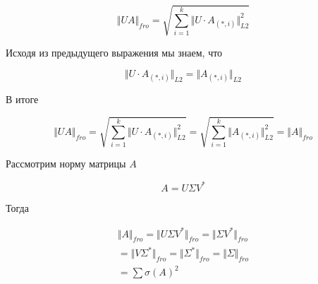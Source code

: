 \documentclass{article}
\begin{document}
    \begin{equation}
        \Vert UA \Vert_{fro} = \sqrt{ \sum_{i = 1}^{k} \Vert U \cdot A_{(*, i)} \Vert_{L2}^{2} }
    \end{equation}

    Исходя из предыдущего выражения мы знаем, что 

    \begin{equation}
        \Vert U \cdot A_{(*, i)} \Vert_{L2} =  \Vert A_{(*, i)} \Vert_{L2}
    \end{equation}

    В итоге 

    
    \begin{equation}
        \Vert UA \Vert_{fro} = \sqrt{ \sum_{i = 1}^{k} \Vert U \cdot A_{(*, i)} \Vert_{L2}^{2} } = \sqrt{ \sum_{i = 1}^{k} \Vert A_{(*, i)} \Vert_{L2}^{2} } = \Vert A \Vert_{fro}
    \end{equation}

    Рассмотрим норму матрицы $A$

    \begin{equation}
        A = U \Sigma V^{*}
    \end{equation}

    Тогда 

    \[
    \begin{gathered}
        \Vert A \Vert_{fro} = \Vert U \Sigma V^{*} \Vert_{fro} = \Vert \Sigma V^{*} \Vert_{fro} \\ 
        = \Vert V \Sigma^{*} \Vert_{fro} = \Vert \Sigma^{*} \Vert_{fro} = \Vert \Sigma \Vert_{fro} \\ 
        = \sum \sigma(A)^{2}
    \end{gathered}
    \]
    


    
\end{document}
